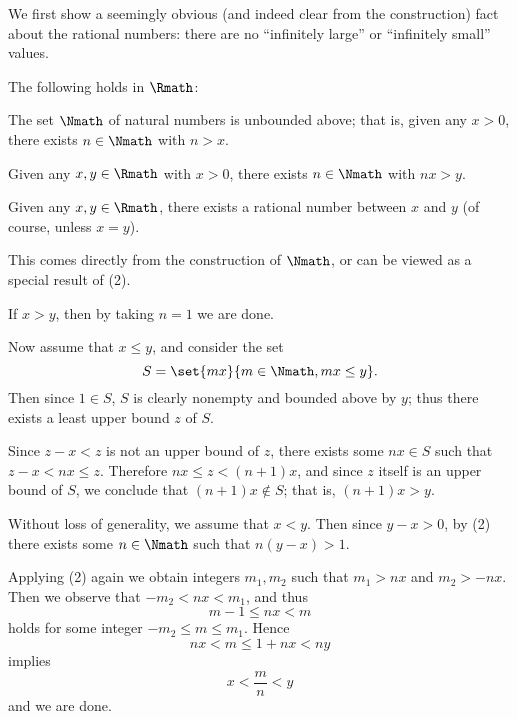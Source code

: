 We first show a seemingly obvious
(and indeed clear from the construction)
fact about the rational numbers:
there are no ``infinitely large'' or ``infinitely small'' values.
\begin{proposition}
    \label{prop:archimedean}
    The following holds in \(\Rmath\):
    \begin{nlist}
        \item The set \(\Nmath\) of natural numbers is unbounded above;
        that is,
        given any \(x>0\), there exists \(n\in\Nmath\) with \(n>x\).
        \item Given any \(x,y\in\Rmath\) with \(x>0\),
        there exists \(n\in\Nmath\) with \(nx>y\).
        \item Given any \(x,y\in\Rmath\),
        there exists a rational number between \(x\) and \(y\)
        (of course, unless \(x=y\)).
    \end{nlist}
\end{proposition}
\begin{myproof}
    \begin{nlist}
        \item This comes directly from the construction of \(\Nmath\),
        or can be viewed as a special result of (2).
        
        \item If \(x>y\), then by taking \(n=1\) we are done.
        
        Now assume that \(x\le y\),
        and consider the set
        \[
            S=\set{mx}{m\in\Nmath, mx\le y}.
        \]
        Then since \(1\in S\),
        \(S\) is clearly nonempty and bounded above by \(y\);
        thus there exists a least upper bound \(z\) of \(S\).
        
        Since \(z-x<z\) is not an upper bound of \(z\),
        there exists some \(nx\in S\) such that \(z-x<nx\le z\).
        Therefore \(nx\le z<(n+1)x\),
        and since \(z\) itself is an upper bound of \(S\),
        we conclude that \((n+1)x\notin S\);
        that is, \((n+1)x>y\).

        \item Without loss of generality,
        we assume that \(x<y\).
        Then since \(y-x>0\),
        by (2) there exists some \(n\in\Nmath\) such that
        \(n(y-x)>1\).

        Applying (2) again we obtain integers \(m_1,m_2\)
        such that \(m_1>nx\) and \(m_2>-nx\).
        Then we observe that \(-m_2<nx<m_1\),
        and thus
        \[
            m-1\le nx<m
        \]
        holds for some integer \(-m_2\le m\le m_1\).
        Hence
        \[
            nx<m\le 1+nx<ny
        \]
        implies 
        \[
            x<\frac{m}{n}<y
        \]
        and we are done.
        \rightqed
    \end{nlist}
\end{myproof}

